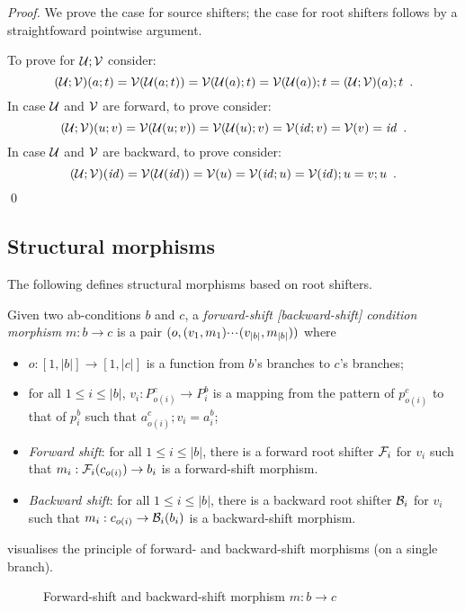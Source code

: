 \begin{proof}
We prove the case for source shifters; the case for root shifters follows by a straightfoward pointwise argument.

To prove  for $\mathcal{U};\mathcal{V}$ consider:
\[ (\mathcal{U};\mathcal{V})(a;t) = \mathcal{V}(\mathcal{U}(a;t))= \mathcal{V}(\mathcal{U}(a);t)=\mathcal{V}(\mathcal{U}(a));t=(\mathcal{U};\mathcal{V})(a);t \enspace. \]
In case $\mathcal{U}$ and $\mathcal{V}$ are forward, to prove  consider:
\[ (\mathcal{U};\mathcal{V})(u;v) = \mathcal{V}(\mathcal{U}(u;v)) = \mathcal{V}(\mathcal{U}(u);v) = \mathcal{V}(\mathit{id};v) = \mathcal{V}(v) = \mathit{id} \enspace. \]
In case $\mathcal{U}$ and $\mathcal{V}$ are backward, to prove  consider:
\[ (\mathcal{U};\mathcal{V})(\mathit{id}) = \mathcal{V}(\mathcal{U}(\mathit{id})) = \mathcal{V}(u) = \mathcal{V}(\mathit{id};u) = \mathcal{V}(\mathit{id});u = v;u \enspace. \]
\qed
\end{proof}

\subsection{Structural morphisms}

The following defines structural morphisms based on root shifters.

\begin{definition}
  Given two ab-conditions $b$ and $c$, a \emph{forward-shift [backward-shift] condition morphism} $m: b \to c$ is a pair $(o,(v_1,m_1){\cdotp\mkern-2mu\cdotp\mkern-2mu\cdotp\mkern1mu} (v_{|b|},m_{|b|}))$ where
  \begin{itemize}
  \item $o:[1,|b|]\to[1,|c|]$ is a function from $b$'s branches to $c$'s branches;
  \item for all $1\leq i\leq |b|$, $v_i:P^c_{o(i)}\to P^b_i$ is a mapping from the pattern of $p^c_{o(i)}$ to that of $p^b_i$ such that $a^c_{o(i)};v_i=a^b_i$;
  \item\emph{Forward shift}: for all $1\leq i\leq |b|$, there is a forward root shifter $\mathcal{F}_i$ for $v_i$ such that $m_i:\mathcal{F}_i(c_{o(i)})\to b_i$ is a forward-shift morphism.
  \item\emph{Backward shift}: for all $1\leq i\leq |b|$, there is a backward root shifter $\mathcal{B}_i$ for $v_i$ such that $m_i:c_{o(i)}\to \mathcal{B}_i(b_i)$ is a backward-shift morphism.
  \end{itemize}
\end{definition}
%
 visualises the principle of forward- and backward-shift morphisms (on a single branch).
%
\begin{figure}
\centering

\caption{Forward-shift and backward-shift morphism $m:b\to c$}
\end{figure}

